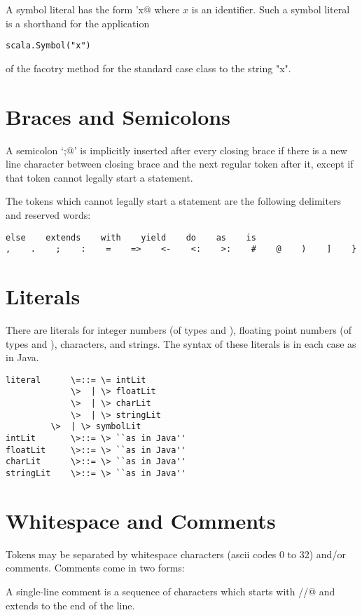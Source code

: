 \documentclass[11pt]{report}
\begin{document}
A symbol literal has the form \verb@'x@ where $x$ is an identifier.
Such a symbol literal is a  shorthand for the application
\begin{verbatim}
scala.Symbol("x")
\end{verbatim}
of the facotry method for the standard case class \verb@Symbol@ to the string "x".

\section{Braces and Semicolons}

A semicolon `\verb@;@' is implicitly inserted after every closing brace
if there is a new line character between closing brace and the next
regular token after it, except if that token cannot legally start a
statement.

The tokens which cannot legally start a statement
are the following delimiters and reserved words:
\begin{verbatim}
else    extends    with    yield    do    as    is
,    .    ;    :    =    =>    <-    <:    >:    #    @    )    ]    }
\end{verbatim}

\section{Literals}

There are literals for integer numbers (of types \verb@Int@ and \verb@Long@),
floating point numbers (of types \verb@Float@ and \verb@Double@), characters, and
strings.  The syntax of these literals is in each case as in Java.

\syntax\begin{verbatim}
literal      \=::= \= intLit
             \>  | \> floatLit
             \>  | \> charLit
             \>  | \> stringLit
	     \>  | \> symbolLit
intLit       \>::= \> ``as in Java''
floatLit     \>::= \> ``as in Java''
charLit      \>::= \> ``as in Java''
stringLit    \>::= \> ``as in Java''
\end{verbatim}

\section{Whitespace and Comments}

Tokens may be separated by whitespace characters (ascii codes 0 to 32)
and/or comments. Comments come in two forms:

A single-line comment is a sequence of characters which starts with
\verb@//@ and extends to the end of the line.
\end{document}
